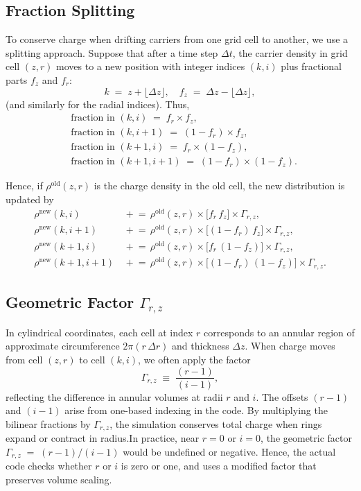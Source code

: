 \subsection{Fraction Splitting}

To conserve charge when drifting carriers from one grid cell to another,
we use a splitting approach. Suppose
that after a time step $\Delta t$, the carrier density in grid cell $(z,r)$
moves to a new position with integer indices $(k,i)$ plus fractional parts
$f_z$ and $f_r$:
%
\[
k \;=\; z + \lfloor \Delta z \rfloor,\quad
f_z \;=\; \Delta z - \lfloor \Delta z \rfloor,
\]
(and similarly for the radial indices). Thus,
\begin{align}
&\text{fraction in }(k, i)   \;=\; f_{r} \times f_{z}, \nonumber\\
&\text{fraction in }(k, i+1) \;=\; (1 - f_{r}) \times f_{z}, \nonumber\\
&\text{fraction in }(k+1, i) \;=\; f_{r} \times (1 - f_{z}), \nonumber\\
&\text{fraction in }(k+1, i+1)\;=\; (1 - f_{r}) \times (1 - f_{z}).
\label{eq:bilinear-fractions}
\end{align}

Hence, if $\rho^{\mathrm{old}}(z,r)$ is the charge density in the old cell,
the new distribution is updated by
\begin{align*}
\rho^{\mathrm{new}}(k,i)   &\,\mathrel{+}=\, \rho^{\mathrm{old}}(z,r)\times \bigl[f_{r}\,f_{z}\bigr] \times \Gamma_{r,z},\\
\rho^{\mathrm{new}}(k,i+1) &\,\mathrel{+}=\, \rho^{\mathrm{old}}(z,r)\times \bigl[(1 - f_{r})\,f_{z}\bigr] \times \Gamma_{r,z},\\
\rho^{\mathrm{new}}(k+1,i) &\,\mathrel{+}=\, \rho^{\mathrm{old}}(z,r)\times \bigl[f_{r}\,(1 - f_{z})\bigr] \times \Gamma_{r,z},\\
\rho^{\mathrm{new}}(k+1,i+1)&\,\mathrel{+}=\, \rho^{\mathrm{old}}(z,r)\times \bigl[(1 - f_{r})\,(1 - f_{z})\bigr] \times \Gamma_{r,z}.
\end{align*}

\subsection{Geometric Factor \texorpdfstring{\boldmath$\Gamma_{r,z}$}{}}
\label{sec:geom-factor}

In cylindrical coordinates, each cell at index $r$ corresponds to an annular
region of approximate circumference $2\pi (r \,\Delta r)$ and thickness
$\Delta z$. When charge moves from cell $(z,r)$ to cell $(k,i)$, we
often apply the factor
\[
\Gamma_{r,z} \;\equiv\; \frac{(r-1)}{(i-1)},
\]
reflecting the difference in annular volumes at radii $r$ and $i$.
The offsets $(r-1)$ and $(i-1)$ arise from one-based indexing in the code. By multiplying the bilinear fractions by $\Gamma_{r,z}$, the simulation conserves total charge when rings expand or contract in radius.In practice, near $r=0$ or $i=0$, the geometric factor $\Gamma_{r,z} \;=\; (r-1)/(i-1)$ would be undefined or negative. Hence, the actual code checks whether $r$ or $i$ is zero or one, and uses a modified factor that preserves volume scaling. 


